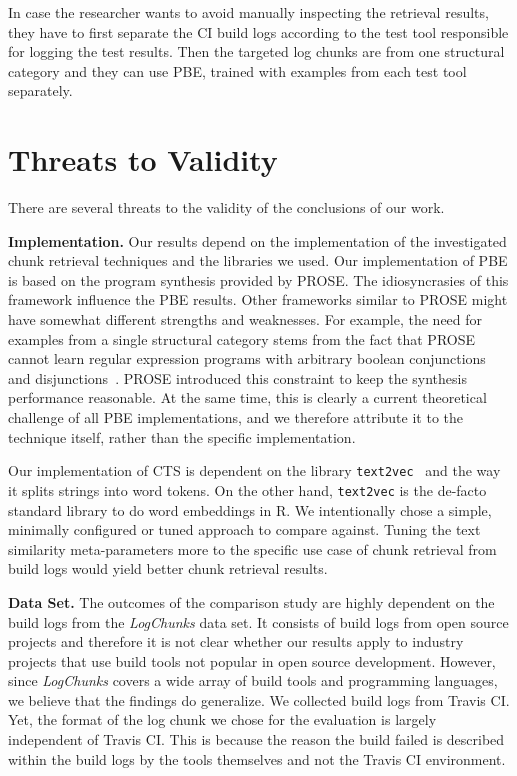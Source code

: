 In case the researcher wants to avoid manually inspecting the
retrieval results, they have to first separate the CI build logs
according to the test tool responsible for logging the test results.
Then the targeted log chunks are from one structural category and they
can use PBE, trained with examples from each test tool separately.

\section{Threats to Validity}
There are several threats to the validity of the conclusions of our
work.

\textbf{Implementation.}
Our results depend on the implementation of the investigated chunk
retrieval techniques and the libraries we used.
Our implementation of
PBE is based on the program synthesis provided by PROSE\@.
The
idiosyncrasies of this framework influence the PBE results.
Other
frameworks similar to PROSE might have somewhat different strengths
and weaknesses.
For example, the need for examples from a single
structural category stems from the fact that PROSE cannot learn
regular expression programs with arbitrary boolean conjunctions and
disjunctions~\cite{mayer2015user}.
PROSE introduced this constraint to
keep the synthesis performance reasonable.
At the same time, this is
clearly a current theoretical challenge of all PBE implementations,
and we therefore attribute it to the technique itself, rather than the
specific implementation.

Our implementation of CTS is dependent on the library
{\tt text2vec}~\cite{text2vec2019webpage}
and the way it splits strings into word tokens.
On the other hand,
{\tt text2vec} is the de-facto standard library to do word embeddings
in R.
We intentionally chose a simple, minimally configured or tuned
approach to compare against.
Tuning the text similarity
meta-parameters more to the specific use case of chunk retrieval from
build logs would yield better chunk retrieval results.


\textbf{Data Set.}
The outcomes of the comparison study are highly dependent on the build
logs from the \emph{LogChunks} data set.
It consists of build
logs from open source projects and therefore it is not clear whether
our results apply to industry projects that use build tools
not popular in open source development.
However, since \emph{LogChunks} covers a wide array of build tools and
programming languages,
we believe that the findings do generalize.
We collected build logs from Travis CI.
Yet, the format of the log chunk we chose
for the evaluation is largely independent of Travis CI\@.
This
is because the reason the build failed is described within the build
logs by the tools themselves and not the Travis CI environment.

